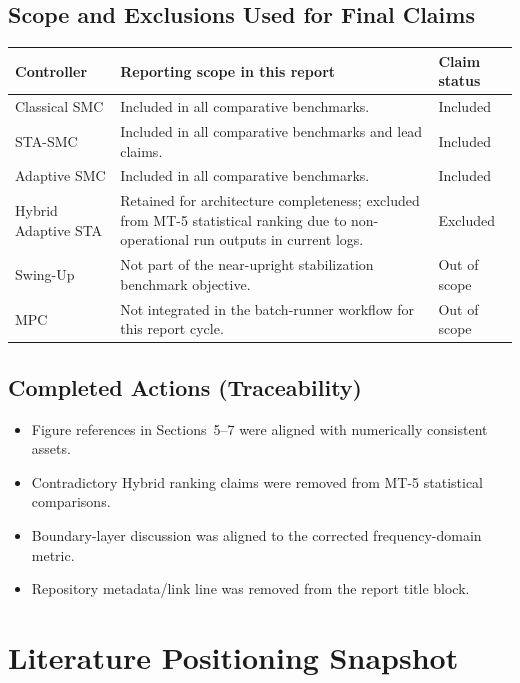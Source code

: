 \documentclass[10pt, a4paper]{article}
\begin{document}
\subsection{Scope and Exclusions Used for Final Claims}
\begin{center}
\small
\begin{tabularx}{\columnwidth}{@{}p{2.2cm}Xp{2.0cm}@{}}
\toprule
\textbf{Controller} & \textbf{Reporting scope in this report} & \textbf{Claim status} \\
\midrule
Classical SMC & Included in all comparative benchmarks. & Included \\
STA-SMC & Included in all comparative benchmarks and lead claims. & Included \\
Adaptive SMC & Included in all comparative benchmarks. & Included \\
Hybrid Adaptive STA & Retained for architecture completeness; excluded from MT-5 statistical ranking due to non-operational run outputs in current logs. & Excluded \\
Swing-Up & Not part of the near-upright stabilization benchmark objective. & Out of scope \\
MPC & Not integrated in the batch-runner workflow for this report cycle. & Out of scope \\
\bottomrule
\end{tabularx}
\end{center}

\subsection{Completed Actions (Traceability)}
\begin{itemize}[leftmargin=1.5em,itemsep=0.25em]
  \item Figure references in Sections~5--7 were aligned with numerically
  consistent assets.
  \item Contradictory Hybrid ranking claims were removed from MT-5 statistical
  comparisons.
  \item Boundary-layer discussion was aligned to the corrected
  frequency-domain metric.
  \item Repository metadata/link line was removed from the report title block.
\end{itemize}

\section{Literature Positioning Snapshot}
\label{app:litcomp}
\end{document}
